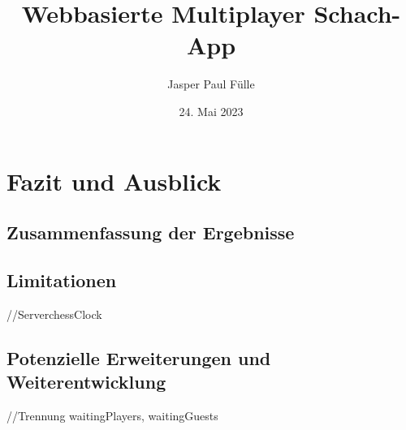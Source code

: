 \documentclass[a4paper, 11pt, bibliography=totoc, abstract=true]{scrreprt}
\title{Webbasierte Multiplayer Schach-App}
\author{Jasper Paul Fülle}
\date{24. Mai 2023}
\begin{document}



\setcounter{page}{1}
\tableofcontents
\newpage
\newpage\thispagestyle{empty}\hspace{1em}\newpage
{}
\setcounter{page}{1}

\newpage
\newpage\thispagestyle{empty}\hspace{1em}\newpage
	
	\newpage
\newpage\thispagestyle{empty}\hspace{1em}\newpage

\newpage
\newpage\thispagestyle{empty}\hspace{1em}\newpage

    \newpage
\newpage\thispagestyle{empty}\hspace{1em}\newpage

\chapter{Fazit und Ausblick}
    \section{Zusammenfassung der Ergebnisse}
    \section{Limitationen}
    //ServerchessClock
    \section{Potenzielle Erweiterungen und Weiterentwicklung}
    //Trennung waitingPlayers, waitingGuests

\appendix

\listoffigures


\end{document}
